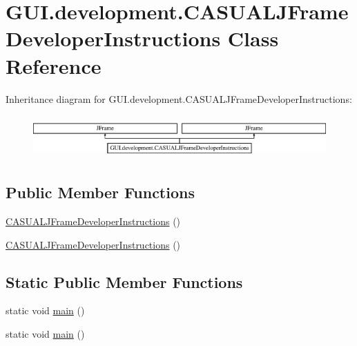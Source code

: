 \hypertarget{class_g_u_i_1_1development_1_1_c_a_s_u_a_l_j_frame_developer_instructions}{\section{G\-U\-I.\-development.\-C\-A\-S\-U\-A\-L\-J\-Frame\-Developer\-Instructions Class Reference}
\label{class_g_u_i_1_1development_1_1_c_a_s_u_a_l_j_frame_developer_instructions}
}
Inheritance diagram for G\-U\-I.\-development.\-C\-A\-S\-U\-A\-L\-J\-Frame\-Developer\-Instructions\-:\begin{figure}[H]
\begin{center}
\leavevmode
\includegraphics[height=1.671642cm]{class_g_u_i_1_1development_1_1_c_a_s_u_a_l_j_frame_developer_instructions}
\end{center}
\end{figure}
\subsection*{Public Member Functions}
\begin{DoxyCompactItemize}
\item 
\hyperlink{class_g_u_i_1_1development_1_1_c_a_s_u_a_l_j_frame_developer_instructions_a032e50fd2b2444c584e5dc9dd4ac1495}{C\-A\-S\-U\-A\-L\-J\-Frame\-Developer\-Instructions} ()
\item 
\hyperlink{class_g_u_i_1_1development_1_1_c_a_s_u_a_l_j_frame_developer_instructions_a032e50fd2b2444c584e5dc9dd4ac1495}{C\-A\-S\-U\-A\-L\-J\-Frame\-Developer\-Instructions} ()
\end{DoxyCompactItemize}
\subsection*{Static Public Member Functions}
\begin{DoxyCompactItemize}
\item 
static void \hyperlink{class_g_u_i_1_1development_1_1_c_a_s_u_a_l_j_frame_developer_instructions_aa7060624c791d6584f86c3319140ba6f}{main} ()
\item 
static void \hyperlink{class_g_u_i_1_1development_1_1_c_a_s_u_a_l_j_frame_developer_instructions_aa7060624c791d6584f86c3319140ba6f}{main} ()
\end{DoxyCompactItemize}



